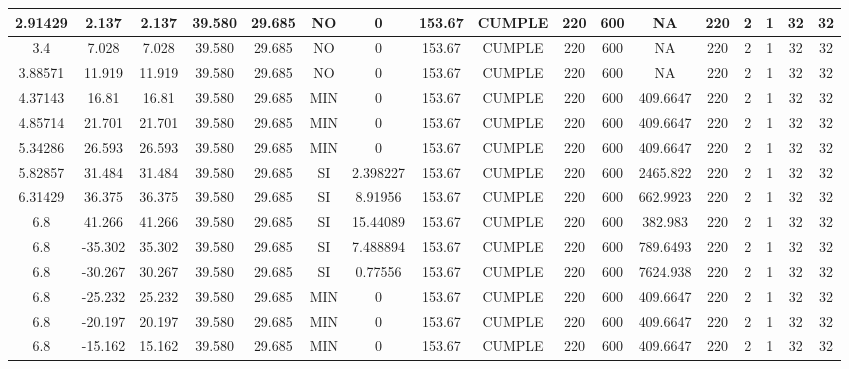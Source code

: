 \begin{table}[h]
{\begin{tabular}{|c|c|c|c|c|c|c|c|c|c|c|c|c|c|c|c|c|}
    \hline
    2.91429 & 2.137 & 2.137 & 39.580 & 29.685 & NO  & 0   & 153.67 & CUMPLE & 220 & 600 & NA  & 220 & 2   & 1   & 32  & 32 \bigstrut\\
    \hline
    3.4 & 7.028 & 7.028 & 39.580 & 29.685 & NO  & 0   & 153.67 & CUMPLE & 220 & 600 & NA  & 220 & 2   & 1   & 32  & 32 \bigstrut\\
    \hline
    3.88571 & 11.919 & 11.919 & 39.580 & 29.685 & NO  & 0   & 153.67 & CUMPLE & 220 & 600 & NA  & 220 & 2   & 1   & 32  & 32 \bigstrut\\
    \hline
    4.37143 & 16.81 & 16.81 & 39.580 & 29.685 & MIN & 0   & 153.67 & CUMPLE & 220 & 600 & 409.6647 & 220 & 2   & 1   & 32  & 32 \bigstrut\\
    \hline
    4.85714 & 21.701 & 21.701 & 39.580 & 29.685 & MIN & 0   & 153.67 & CUMPLE & 220 & 600 & 409.6647 & 220 & 2   & 1   & 32  & 32 \bigstrut\\
    \hline
    5.34286 & 26.593 & 26.593 & 39.580 & 29.685 & MIN & 0   & 153.67 & CUMPLE & 220 & 600 & 409.6647 & 220 & 2   & 1   & 32  & 32 \bigstrut\\
    \hline
    5.82857 & 31.484 & 31.484 & 39.580 & 29.685 & SI  & 2.398227 & 153.67 & CUMPLE & 220 & 600 & 2465.822 & 220 & 2   & 1   & 32  & 32 \bigstrut\\
    \hline
    6.31429 & 36.375 & 36.375 & 39.580 & 29.685 & SI  & 8.91956 & 153.67 & CUMPLE & 220 & 600 & 662.9923 & 220 & 2   & 1   & 32  & 32 \bigstrut\\
    \hline
    6.8 & 41.266 & 41.266 & 39.580 & 29.685 & SI  & 15.44089 & 153.67 & CUMPLE & 220 & 600 & 382.983 & 220 & 2   & 1   & 32  & 32 \bigstrut\\
    \hline
    6.8 & -35.302 & 35.302 & 39.580 & 29.685 & SI  & 7.488894 & 153.67 & CUMPLE & 220 & 600 & 789.6493 & 220 & 2   & 1   & 32  & 32 \bigstrut\\
    \hline
    6.8 & -30.267 & 30.267 & 39.580 & 29.685 & SI  & 0.77556 & 153.67 & CUMPLE & 220 & 600 & 7624.938 & 220 & 2   & 1   & 32  & 32 \bigstrut\\
    \hline
    6.8 & -25.232 & 25.232 & 39.580 & 29.685 & MIN & 0   & 153.67 & CUMPLE & 220 & 600 & 409.6647 & 220 & 2   & 1   & 32  & 32 \bigstrut\\
    \hline
    6.8 & -20.197 & 20.197 & 39.580 & 29.685 & MIN & 0   & 153.67 & CUMPLE & 220 & 600 & 409.6647 & 220 & 2   & 1   & 32  & 32 \bigstrut\\
    \hline
    6.8 & -15.162 & 15.162 & 39.580 & 29.685 & MIN & 0   & 153.67 & CUMPLE & 220 & 600 & 409.6647 & 220 & 2   & 1   & 32  & 32 \bigstrut\\

\end{tabular}}
\end{table}
